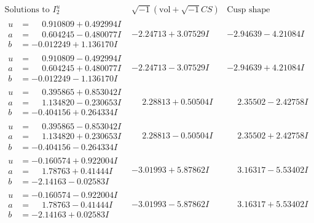\documentclass[1p]{elsarticle_modified}
\theoremstyle{definition}
\newcommand{\I}{\sqrt{-1}}
\begin{document}
$$\begin{array}{c|c|c}  
\text{Solutions to }I^u_{2}& \I (\text{vol} + \sqrt{-1}CS) & \text{Cusp shape}\\
 \hline 
\begin{aligned}
u &= \phantom{-}0.910809 + 0.492994 I \\
a &= \phantom{-}0.604245 - 0.480077 I \\
b &= -0.012249 + 1.136170 I\end{aligned}
 & -2.24713 + 3.07529 I & -2.94639 - 4.21084 I \\ \hline\begin{aligned}
u &= \phantom{-}0.910809 - 0.492994 I \\
a &= \phantom{-}0.604245 + 0.480077 I \\
b &= -0.012249 - 1.136170 I\end{aligned}
 & -2.24713 - 3.07529 I & -2.94639 + 4.21084 I \\ \hline\begin{aligned}
u &= \phantom{-}0.395865 + 0.853042 I \\
a &= \phantom{-}1.134820 - 0.230653 I \\
b &= -0.404156 + 0.264334 I\end{aligned}
 & \phantom{-}2.28813 + 0.50504 I & \phantom{-}2.35502 - 2.42758 I \\ \hline\begin{aligned}
u &= \phantom{-}0.395865 - 0.853042 I \\
a &= \phantom{-}1.134820 + 0.230653 I \\
b &= -0.404156 - 0.264334 I\end{aligned}
 & \phantom{-}2.28813 - 0.50504 I & \phantom{-}2.35502 + 2.42758 I \\ \hline\begin{aligned}
u &= -0.160574 + 0.922004 I \\
a &= \phantom{-}1.78763 + 0.41444 I \\
b &= -2.14163 - 0.02583 I\end{aligned}
 & -3.01993 + 5.87862 I & \phantom{-}3.16317 - 5.53402 I \\ \hline\begin{aligned}
u &= -0.160574 - 0.922004 I \\
a &= \phantom{-}1.78763 - 0.41444 I \\
b &= -2.14163 + 0.02583 I\end{aligned}
 & -3.01993 - 5.87862 I & \phantom{-}3.16317 + 5.53402 I \\ \hline\begin{aligned}

\end{aligned}
\end{array}$$
\end{document}
